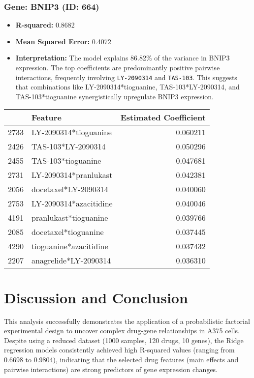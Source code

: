 \documentclass[12pt]{article}
\begin{document}
\subsubsection{Gene: BNIP3 (ID: 664)}
\begin{itemize}
    \item \textbf{R-squared:} 0.8682
    \item \textbf{Mean Squared Error:} 0.4072
    \item \textbf{Interpretation:} The model explains 86.82\% of the variance in BNIP3 expression. The top coefficients are predominantly positive pairwise interactions, frequently involving \texttt{LY-2090314} and \texttt{TAS-103}. This suggests that combinations like LY-2090314*tioguanine, TAS-103*LY-2090314, and TAS-103*tioguanine synergistically upregulate BNIP3 expression.
\end{itemize}
\begin{tabularx}{\textwidth}{l X r}
\toprule
{} & Feature & Estimated Coefficient \\
\midrule
2733 & LY-2090314*tioguanine & 0.060211 \\
2426 & TAS-103*LY-2090314 & 0.050296 \\
2455 & TAS-103*tioguanine & 0.047681 \\
2731 & LY-2090314*pranlukast & 0.042381 \\
2056 & docetaxel*LY-2090314 & 0.040060 \\
2753 & LY-2090314*azacitidine & 0.040046 \\
4191 & pranlukast*tioguanine & 0.039766 \\
2085 & docetaxel*tioguanine & 0.037445 \\
4290 & tioguanine*azacitidine & 0.037432 \\
2207 & anagrelide*LY-2090314 & 0.036310 \\
\bottomrule
\end{tabularx}

\section{Discussion and Conclusion}

This analysis successfully demonstrates the application of a probabilistic factorial experimental design to uncover complex drug-gene relationships in A375 cells. Despite using a reduced dataset (1000 samples, 120 drugs, 10 genes), the Ridge regression models consistently achieved high R-squared values (ranging from 0.6698 to 0.9804), indicating that the selected drug features (main effects and pairwise interactions) are strong predictors of gene expression changes.
\end{document}
